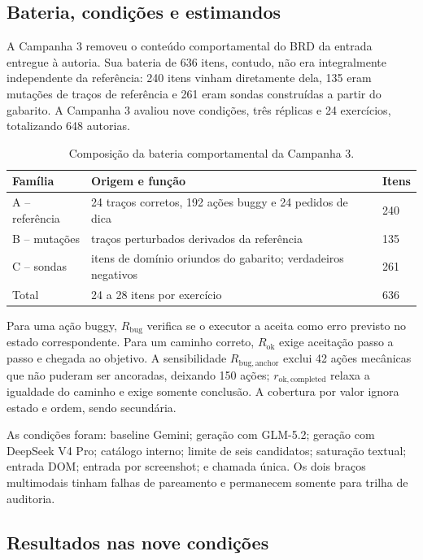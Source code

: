 \documentclass[11pt,a4paper]{article}
\newcommand{\Rbug}{\ensuremath{R_{\mathrm{bug}}}}
\newcommand{\Rok}{\ensuremath{R_{\mathrm{ok}}}}
\newcommand{\Rbuganchor}{\ensuremath{R_{\mathrm{bug,anchor}}}}
\newcommand{\Rokcompleted}{\ensuremath{r_{\mathrm{ok,completed}}}}
\begin{document}
\subsection{Bateria, condições e estimandos}

A Campanha 3 removeu o conteúdo comportamental do BRD da entrada entregue à autoria. Sua bateria de 636 itens, contudo, não era integralmente independente da referência: 240 itens vinham diretamente dela, 135 eram mutações de traços de referência e 261 eram sondas construídas a partir do gabarito. A Campanha 3 avaliou nove condições, três réplicas e 24 exercícios, totalizando 648 autorias.

\begin{table}[H]
\centering
\caption{Composição da bateria comportamental da Campanha 3.}
\label{tab:s-c3-battery}
\small
\begin{tabularx}{\textwidth}{@{}P{3.4cm}Y R{1.8cm}@{}}
\toprule
Família & Origem e função & Itens \\
\midrule
A -- referência & 24 traços corretos, 192 ações buggy e 24 pedidos de dica & 240 \\
B -- mutações & traços perturbados derivados da referência & 135 \\
C -- sondas & itens de domínio oriundos do gabarito; verdadeiros negativos & 261 \\
\midrule
Total & 24 a 28 itens por exercício & 636 \\
\bottomrule
\end{tabularx}
\end{table}

Para uma ação buggy, \Rbug{} verifica se o executor a aceita como erro previsto no estado correspondente. Para um caminho correto, \Rok{} exige aceitação passo a passo e chegada ao objetivo. A sensibilidade \Rbuganchor{} exclui 42 ações mecânicas que não puderam ser ancoradas, deixando 150 ações; \Rokcompleted{} relaxa a igualdade do caminho e exige somente conclusão. A cobertura por valor ignora estado e ordem, sendo secundária.

As condições foram: baseline Gemini; geração com GLM-5.2; geração com DeepSeek V4 Pro; catálogo interno; limite de seis candidatos; saturação textual; entrada DOM; entrada por screenshot; e chamada única. Os dois braços multimodais tinham falhas de pareamento e permanecem somente para trilha de auditoria.

\subsection{Resultados nas nove condições}
\end{document}
